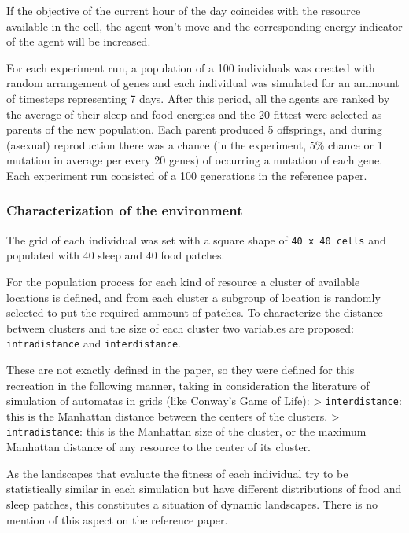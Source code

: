\documentclass[11pt]{article}
\begin{document}
If the objective of the current hour of the day coincides with the
resource available in the cell, the agent won't move and the
corresponding energy indicator of the agent will be increased.

For each experiment run, a population of a 100 individuals was created
with random arrangement of genes and each individual was simulated for
an ammount of timesteps representing 7 days. After this period, all the
agents are ranked by the average of their sleep and food energies and
the 20 fittest were selected as parents of the new population. Each
parent produced 5 offsprings, and during (asexual) reproduction there
was a chance (in the experiment, 5\% chance or 1 mutation in average per
every 20 genes) of occurring a mutation of each gene. Each experiment
run consisted of a 100 generations in the reference paper.

    \hypertarget{characterization-of-the-environment}{%
\subsubsection{Characterization of the
environment}\label{characterization-of-the-environment}}

The grid of each individual was set with a square shape of
\texttt{40\ x\ 40\ cells} and populated with 40 sleep and 40 food
patches.

For the population process for each kind of resource a cluster of
available locations is defined, and from each cluster a subgroup of
location is randomly selected to put the required ammount of patches. To
characterize the distance between clusters and the size of each cluster
two variables are proposed: \texttt{intradistance} and
\texttt{interdistance}.

These are not exactly defined in the paper, so they were defined for
this recreation in the following manner, taking in consideration the
literature of simulation of automatas in grids (like Conway's Game of
Life): \textgreater{} \texttt{interdistance}: this is the Manhattan
distance between the centers of the clusters. \textgreater{}
\texttt{intradistance}: this is the Manhattan size of the cluster, or
the maximum Manhattan distance of any resource to the center of its
cluster.

As the landscapes that evaluate the fitness of each individual try to be
statistically similar in each simulation but have different
distributions of food and sleep patches, this constitutes a situation of
dynamic landscapes. There is no mention of this aspect on the reference
paper.
\end{document}
